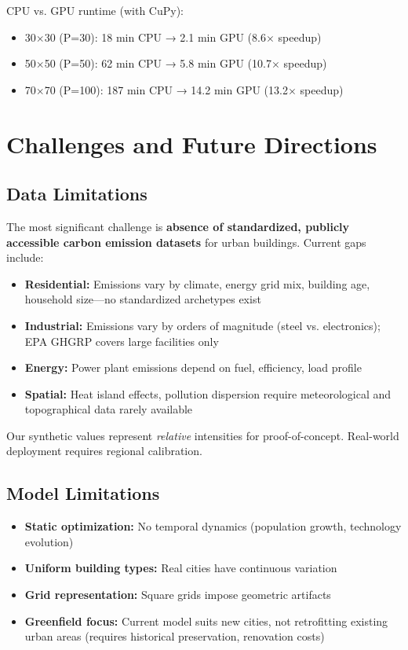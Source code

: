 \documentclass[conference]{IEEEtran}
\begin{document}
CPU vs. GPU runtime (with CuPy):
\begin{itemize}
    \item 30$\times$30 (P=30): 18 min CPU → 2.1 min GPU (8.6$\times$ speedup)
    \item 50$\times$50 (P=50): 62 min CPU → 5.8 min GPU (10.7$\times$ speedup)
    \item 70$\times$70 (P=100): 187 min CPU → 14.2 min GPU (13.2$\times$ speedup)
\end{itemize}

\section{Challenges and Future Directions}

\subsection{Data Limitations}

The most significant challenge is \textbf{absence of standardized, publicly accessible carbon emission datasets} for urban buildings. Current gaps include:

\begin{itemize}
    \item \textbf{Residential:} Emissions vary by climate, energy grid mix, building age, household size—no standardized archetypes exist
    \item \textbf{Industrial:} Emissions vary by orders of magnitude (steel vs. electronics); EPA GHGRP covers large facilities only
    \item \textbf{Energy:} Power plant emissions depend on fuel, efficiency, load profile
    \item \textbf{Spatial:} Heat island effects, pollution dispersion require meteorological and topographical data rarely available
\end{itemize}

Our synthetic values represent \textit{relative} intensities for proof-of-concept. Real-world deployment requires regional calibration.

\subsection{Model Limitations}

\begin{itemize}
    \item \textbf{Static optimization:} No temporal dynamics (population growth, technology evolution)
    \item \textbf{Uniform building types:} Real cities have continuous variation
    \item \textbf{Grid representation:} Square grids impose geometric artifacts
    \item \textbf{Greenfield focus:} Current model suits new cities, not retrofitting existing urban areas (requires historical preservation, renovation costs)
\end{itemize}
\end{document}
